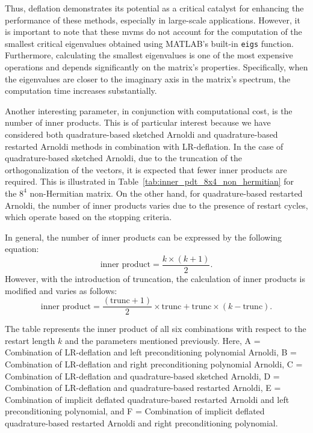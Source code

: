 Thus, deflation demonstrates its potential as a critical catalyst for enhancing the performance of these methods, especially in large-scale applications. However, it is important to note that these mvms do not account for the computation of the smallest critical eigenvalues obtained using MATLAB's built-in \texttt{eigs} function. Furthermore, calculating the smallest eigenvalues is one of the most expensive operations and depends significantly on the matrix's properties. Specifically, when the eigenvalues are closer to the imaginary axis in the matrix's spectrum, the computation time increases substantially.

Another interesting parameter, in conjunction with computational cost, is the number of inner products. This is of particular interest because we have considered both quadrature-based sketched Arnoldi and quadrature-based restarted Arnoldi methods in combination with LR-deflation. In the case of quadrature-based sketched Arnoldi, due to the truncation of the orthogonalization of the vectors, it is expected that fewer inner products are required. This is illustrated in Table~\ref{tab:inner_pdt_8x4_non_hermitian} for the $8^4$ non-Hermitian matrix. On the other hand, for quadrature-based restarted Arnoldi, the number of inner products varies due to the presence of restart cycles, which operate based on the stopping criteria.

In general, the number of inner products can be expressed by the following equation:
\begin{equation}
    \text{inner product} = \frac{k \times (k+1)}{2}.
\end{equation}
However, with the introduction of truncation, the calculation of inner products is modified and varies as follows:
\begin{equation}
    \text{inner product} = \frac{(\text{trunc}+1)}{2} \times \text{trunc} + \text{trunc} \times (k - \text{trunc}).
\end{equation}


\begin{table}[H]
    \label{tab:inner_pdt_8x4_non_hermitian}
    \centering
     
     \caption{\small The table represents the inner product of all six combinations with respect to the restart length $k$ and the parameters mentioned previously. Here, 
        A = Combination of LR-deflation and left preconditioning polynomial Arnoldi, 
        B = Combination of LR-deflation and right preconditioning polynomial Arnoldi, 
        C = Combination of LR-deflation and quadrature-based sketched Arnoldi, 
        D = Combination of LR-deflation and quadrature-based restarted Arnoldi, 
        E = Combination of implicit deflated quadrature-based restarted Arnoldi and left preconditioning polynomial, and 
        F = Combination of implicit deflated quadrature-based restarted Arnoldi and right preconditioning polynomial.}

\end{table}

